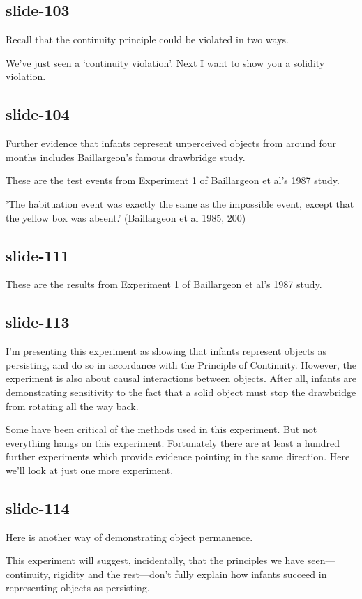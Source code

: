 \documentclass[12pt,\papersize]{extarticle}
\begin{document}
\subsection{slide-103}
Recall that the continuity principle could be violated in two ways.
 
We've just seen a `continuity violation'.  Next I want to show you a solidity violation.
 
\subsection{slide-104}
Further evidence that infants represent unperceived objects from around four months 
includes Baillargeon's famous drawbridge study.
 
These are the test events from Experiment 1 of Baillargeon et al's 1987 study.
 
'The habituation event was exactly the same as the impossible event, except that the yellow box was absent.' (Baillargeon et al 1985, 200)
 
\subsection{slide-111}
These are the results from Experiment 1 of Baillargeon et al's 1987 study.
 
\subsection{slide-113}
I'm presenting this experiment as showing that infants represent objects as persisting, and do so
in accordance with the Principle of Continuity.  However, the experiment is also about 
causal interactions between objects.  After all, infants are demonstrating sensitivity to
the fact that a solid object must stop the drawbridge from rotating all the way back.
 
Some have been critical of the methods used in this experiment.
But not everything hangs on this experiment.
Fortunately there are at least a hundred further experiments which provide evidence pointing in the same direction.
Here we'll look at just one more experiment.
 
\subsection{slide-114}
Here is another way of demonstrating object permanence.
 
This experiment will suggest, incidentally, that the principles we have seen---continuity,
rigidity and the rest---don't fully explain how infants succeed in representing objects as persisting.
 
\end{document}

